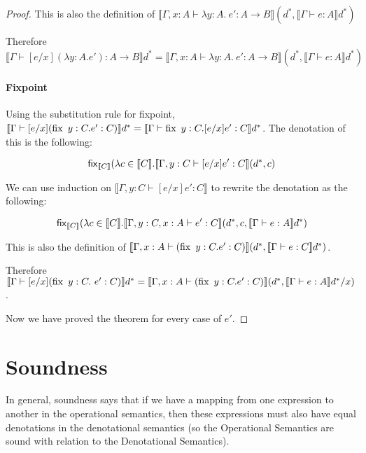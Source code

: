 \begin{proof}
This is also the definition of $\llbracket \Gamma, x : A \vdash \lambda y : A. \ e' : A \to B \rrbracket (d^*, \llbracket \Gamma \vdash e : A \rrbracket d^*)$

Therefore $\llbracket \Gamma \vdash [e/x](\lambda y : A.e') : A \to B \rrbracket d^* = \llbracket \Gamma, x : A \vdash \lambda y : A. \ e' : A \to B \rrbracket (d^*, \llbracket \Gamma \vdash e : A \rrbracket d^*)$


\paragraph{Fixpoint} Using the substitution rule for fixpoint, $\llbracket \Gamma \vdash [e/x](\operatorname{fix} \ y : C . e' : C) \rrbracket d^* = \llbracket \Gamma \vdash \operatorname{fix} \ y : C . [e/x]e' : C \rrbracket d^*$. The denotation of this is the following:

\[\operatorname{\mathsf{fix}}_{\llbracket C \rrbracket} (\lambda c \in \llbracket C \rrbracket . \llbracket \Gamma, y : C \vdash [e/x]e' : C \rrbracket (d^*, c)\]

 We can use induction on $\llbracket \Gamma, y : C \vdash [e/x]e' : C \rrbracket$ to rewrite the denotation as the following:

\[\operatorname{\mathsf{fix}}_{\llbracket C \rrbracket} (\lambda c \in \llbracket C \rrbracket . \llbracket \Gamma, y : C, x : A \vdash e' : C \rrbracket (d^*, c, \llbracket \Gamma \vdash e : A \rrbracket d^*)\] 

This is also the definition of $\llbracket \Gamma, x : A \vdash (\operatorname{fix} \ y : C . e' : C) \rrbracket (d^*, \llbracket \Gamma \vdash e : C \rrbracket d^*)$.

\vspace{0.25cm}

Therefore $\llbracket \Gamma \vdash [e/x](\operatorname{fix} \ y : C . \ e' : C) \rrbracket d^* = \llbracket \Gamma, x : A \vdash (\operatorname{fix} \ y : C . e' : C) \rrbracket (d^*, \llbracket \Gamma \vdash e : A \rrbracket d^* / x)$.

\vspace{0.25cm}

Now we have proved the theorem for every case of $e'$.
\end{proof}

\section{Soundness}\label{sound}
In general, soundness says that if we have a mapping from one expression to another in the operational semantics, then these expressions must also have equal denotations in the denotational semantics (so the Operational Semantics are sound with relation to the Denotational Semantics).
 
